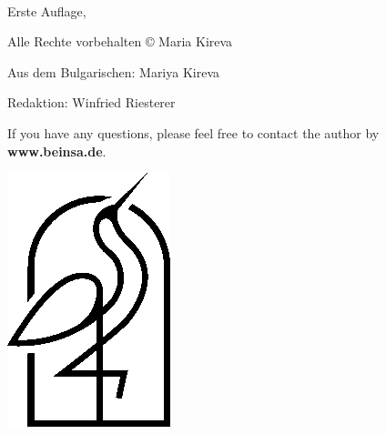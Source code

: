 {\small
\setlength{\parindent}{0em}\setlength{\parskip}{1em}
~
\vfill

Erste Auflage, \editionyear{}

Alle Rechte vorbehalten \copyright{} \editionyear{} Maria Kireva

Aus dem Bulgarischen: Mariya Kireva

Redaktion: Winfried Riesterer

If you have any questions, please feel free to contact the author by \\ \textbf{www.beinsa.de}.


\ifx\isbn\undefined\else\if\relax\detokenize\expandafter{\isbn}\relax{}\fi\fi

\includegraphics[width=0.07\linewidth]{frontmatter/logo-black.png}

\publisher{}
}
